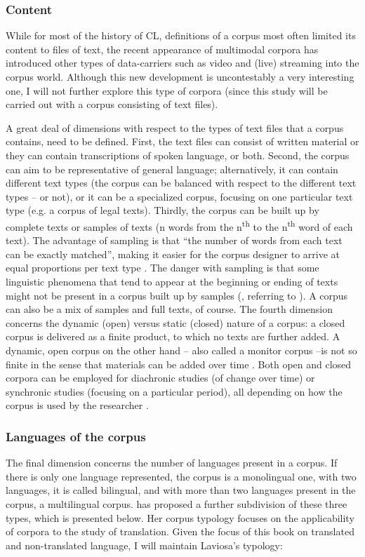 \subsubsection{Content}
While for most of the history of CL, definitions of a corpus most often limited its content to files of text, the recent appearance of multimodal corpora has introduced other types of data-carriers such as video and (live) streaming into the corpus world. Although this new development is uncontestably a very interesting one, I will not further explore this type of corpora (since this study will be carried out with a corpus consisting of text files).

A great deal of dimensions with respect to the types of text files that a corpus contains, need to be defined. First, the text files can consist of written material or they can contain transcriptions of spoken language, or both. Second, the corpus can aim to be representative of general language; alternatively, it can contain different text types (the corpus can be balanced with respect to the different text types – or not), or it can be a specialized corpus, focusing on one particular text type (e.g. a corpus of legal texts). Thirdly, the corpus can be built up by complete texts or samples of texts (n words from the n\textsuperscript{th} to the n\textsuperscript{th} word of each text). The advantage of sampling is that “the number of words from each text can be exactly matched”, making it easier for the corpus designer to arrive at equal proportions per text type \citep[77]{deignan_metaphor_2005}. The danger with sampling is that some linguistic phenomena that tend to appear at the beginning or ending of texts might not be present in a corpus built up by samples (\citealt[77]{deignan_metaphor_2005}, referring to \citealt{stubbs_text_1996}). A corpus can also be a mix of samples and full texts, of course. The fourth dimension concerns the dynamic (open) versus static (closed) nature of a corpus: a closed corpus is delivered as a finite product, to which no texts are further added. A dynamic, open corpus on the other hand – also called a monitor corpus –is not so finite in the sense that materials can be added over time \citep[6]{mcenery_corpus_2012}. Both open and closed corpora can be employed for diachronic studies (of change over time) or synchronic studies (focusing on a particular period), all depending on how the corpus is used by the researcher \citep[3]{johansson_role_1998}.

\subsubsection{Languages of the corpus}
\label{sec:2.2.1.3}  
The final dimension concerns the number of languages present in a corpus. If there is only one language represented, the corpus is a monolingual one, with two languages, it is called bilingual, and with more than two languages present in the corpus, a multilingual corpus. \citet[36-38]{laviosa_corpus-based_2002} has proposed a further subdivision of these three types, which is presented below. Her corpus typology focuses on the applicability of corpora to the study of translation. Given the focus of this book on translated and non-translated language, I will maintain Laviosa’s typology:


